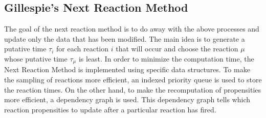 \documentclass[11pt,a4paper]{article}
\begin{document}
\subsection{Gillespie's Next Reaction Method}
The goal of the next reaction method is to do away with the above processes and update only the data that has been modified. The main idea is to generate a putative time $\tau_i$ for each reaction $i$ that will occur and choose the reaction $\mu$ whose putative time $\tau_{\mu}$ is least. In order to minimize the computation time, the Next Reaction Method is implemented using specific data structures.
To make the sampling of reactions more efficient, an indexed priority queue is used to store the reaction times. On the other hand, to make the recomputation of propensities more efficient, a dependency graph is used. This dependency graph tells which reaction propensities to update after a particular reaction has fired.
\end{document}
